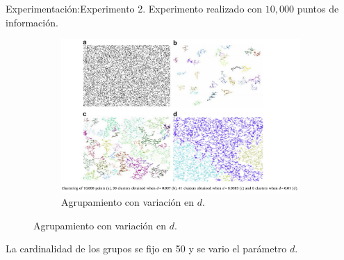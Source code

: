 
\begin{frame}[fragile]{Experimentación:}{Experimento 2.}
  Experimento realizado con $10,000$ puntos de información.
  \begin{figure}
    \centering
    \begin{subfigure}[b]{0.6\textwidth}
      \includegraphics[width=\textwidth]{./Imagenes/Exp2.png}
      \caption*{Agrupamiento con variación en $d$.}
    \end{subfigure}
  \end{figure}
  La cardinalidad de los grupos se fijo en 50 y se vario el parámetro $d$.
\end{frame}
